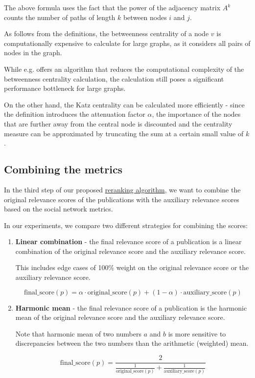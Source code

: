 The above formula uses the fact that the power of the adjacency matrix $A^k$ counts the number of paths of length $k$ between nodes $i$ and $j$.

\begin{mybox}{}
As follows from the definitions, the betweenness centrality of a node $v$ is computationally expensive 
to calculate for large graphs, as it considers all pairs of nodes in the graph.

While e.g. \cite{brandes-faster-centrality} offers an algorithm that reduces the computational complexity of the betweenness centrality calculation,
the calculation still poses a significant performance bottleneck for large graphs.

\label{katz-faster}
On the other hand, the Katz centrality can be calculated more efficiently - since the definition introduces 
the attenuation factor $\alpha$, the importance of the nodes that are further away from the central node is discounted
and the centrality measure can be approximated by truncating the sum at a certain small value of $k$.
\end{mybox}

\subsection{Combining the metrics}

In the third step of our proposed \hyperref[reranking-algorithm]{reranking algorithm},
we want to combine the original relevance scores of the publications with the auxiliary 
relevance scores based on the social network metrics.

In our experiments, we compare two different strategies for combining the scores:

\begin{enumerate}
    \item \textbf{Linear combination} - the final relevance score of a publication is a linear combination of the original relevance score and the auxiliary relevance score. 
    
    This includes edge cases of 100\% weight on the original relevance score or the auxiliary relevance score.

    $$
    \text{final\_score}(p) = \alpha \cdot \text{original\_score}(p) + (1 - \alpha) \cdot \text{auxiliary\_score}(p)
    $$
    \item \textbf{Harmonic mean} - the final relevance score of a publication is the harmonic mean of the original relevance score and the auxiliary relevance score.
    
    Note that harmonic mean of two numbers $a$ and $b$ is more sensitive to discrepancies between the two numbers than the arithmetic (weighted) mean.

    $$
    \text{final\_score}(p) = \frac{2}{\frac{1}{\text{original\_score}(p)} + \frac{1}{\text{auxiliary\_score}(p)}}
    $$
\end{enumerate}
    
